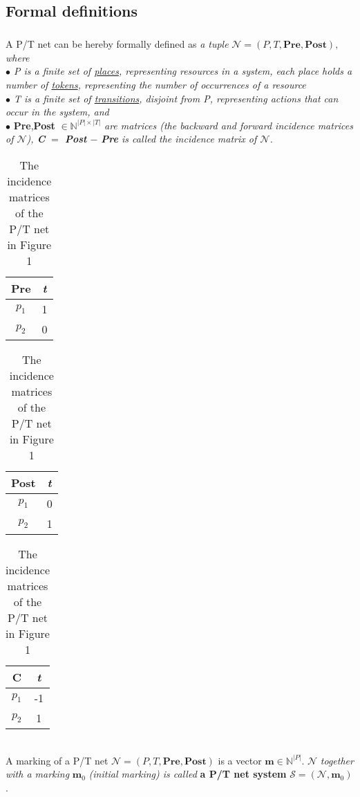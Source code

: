 \documentclass{article}
\begin{document}
	\subsection{Formal definitions}
	\subparagraph{}A P/T net can be hereby formally defined as\textit{ a tuple} $\mathcal{N} = (P,T,\textbf{Pre},\textbf{Post}),$ \textit{where
		\\$\bullet$ P is a finite set of \underline{places}, representing resources in a system, each place holds a number of \underline{tokens}, representing the number of occurrences of a resource
		\\$\bullet$ T is a finite set of \underline{transitions}, disjoint from P, representing actions that can occur in the system, and} 
		\\$\bullet$ \textbf{Pre},\textbf{Post} $\in\mathbb{N}^{|P|\times|T|}$ \textit{are matrices (the backward and forward incidence matrices of $\mathcal{N}$), \textbf{C} $=$ \textbf{Post} $-$ \textbf{Pre} is called the incidence matrix of $\mathcal{N}$.}
	\begin{table}[h]
		\begin{center}
			\begin{tabular}{ |c|c| } 
				\hline
				\textbf{Pre} & \textit{t}\\
				\hline
				$\textit{p}_{1}$ & 1\\ 
				$\textit{p}_{2}$ & 0\\ 
				\hline
			\end{tabular}
			\begin{tabular}{ |c|c| } 
				\hline
				\textbf{Post} & \textit{t}\\
				\hline
				$\textit{p}_{1}$ & 0\\ 
				$\textit{p}_{2}$ & 1\\ 
				\hline
			\end{tabular}
			\begin{tabular}{ |c|c| } 
				\hline
				\textbf{C} & \textit{t}\\
				\hline
				$\textit{p}_{1}$ & -1\\ 
				$\textit{p}_{2}$ & 1\\ 
				\hline
			\end{tabular}
			\caption{The incidence matrices of the P/T net in Figure 1}			
		\end{center}
	\end{table}
	\\A marking of a P/T net $\mathcal{N} = (P,T,\textbf{Pre},\textbf{Post})$ is a vector $\textbf{m}\in\mathbb{N}^{|P|}$. $\mathcal{N}$ \textit{together with a marking }$\textbf{m}_{0}$ \textit{(initial marking) is called} \textbf{a P/T net system} $\mathcal{S} = (\mathcal{N},\textbf{m}_{0})$. 
\end{document}
